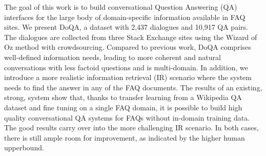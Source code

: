 The goal of this work is to build conversational Question Answering (QA) interfaces for the large body of domain-specific information available in FAQ sites. We present DoQA, a dataset with 2,437 dialogues and 10,917 QA pairs. The dialogues are collected from three Stack Exchange sites using the Wizard of Oz method with crowdsourcing. Compared to previous work, DoQA comprises well-defined information needs, leading to more coherent and natural conversations with less factoid questions and is multi-domain. In addition, we introduce a more realistic information retrieval (IR) scenario where the system needs to find the answer in any of the FAQ documents. The results of an existing, strong, system show that, thanks to transfer learning from a Wikipedia QA dataset and fine tuning on a single FAQ domain, it is possible to build high quality conversational QA systems for FAQs without in-domain training data. The good results carry over into the more challenging IR scenario. In both cases, there is still ample room for improvement, as indicated by the higher human upperbound.
